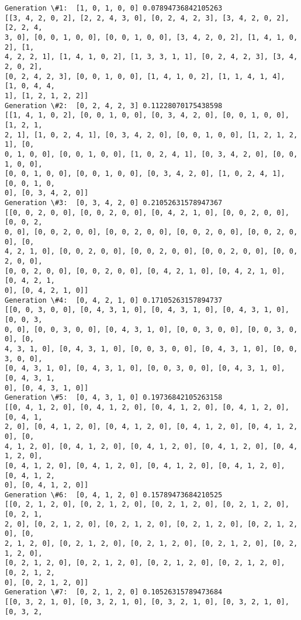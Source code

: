 \documentclass[11pt]{article}
\begin{document}
    \begin{Verbatim}[commandchars=\\\{\}]
Generation \#1:  [1, 0, 1, 0, 0] 0.07894736842105263
[[3, 4, 2, 0, 2], [2, 2, 4, 3, 0], [0, 2, 4, 2, 3], [3, 4, 2, 0, 2], [2, 2, 4,
3, 0], [0, 0, 1, 0, 0], [0, 0, 1, 0, 0], [3, 4, 2, 0, 2], [1, 4, 1, 0, 2], [1,
4, 2, 2, 1], [1, 4, 1, 0, 2], [1, 3, 3, 1, 1], [0, 2, 4, 2, 3], [3, 4, 2, 0, 2],
[0, 2, 4, 2, 3], [0, 0, 1, 0, 0], [1, 4, 1, 0, 2], [1, 1, 4, 1, 4], [1, 0, 4, 4,
1], [1, 2, 1, 2, 2]]
Generation \#2:  [0, 2, 4, 2, 3] 0.11228070175438598
[[1, 4, 1, 0, 2], [0, 0, 1, 0, 0], [0, 3, 4, 2, 0], [0, 0, 1, 0, 0], [1, 2, 1,
2, 1], [1, 0, 2, 4, 1], [0, 3, 4, 2, 0], [0, 0, 1, 0, 0], [1, 2, 1, 2, 1], [0,
0, 1, 0, 0], [0, 0, 1, 0, 0], [1, 0, 2, 4, 1], [0, 3, 4, 2, 0], [0, 0, 1, 0, 0],
[0, 0, 1, 0, 0], [0, 0, 1, 0, 0], [0, 3, 4, 2, 0], [1, 0, 2, 4, 1], [0, 0, 1, 0,
0], [0, 3, 4, 2, 0]]
Generation \#3:  [0, 3, 4, 2, 0] 0.21052631578947367
[[0, 0, 2, 0, 0], [0, 0, 2, 0, 0], [0, 4, 2, 1, 0], [0, 0, 2, 0, 0], [0, 0, 2,
0, 0], [0, 0, 2, 0, 0], [0, 0, 2, 0, 0], [0, 0, 2, 0, 0], [0, 0, 2, 0, 0], [0,
4, 2, 1, 0], [0, 0, 2, 0, 0], [0, 0, 2, 0, 0], [0, 0, 2, 0, 0], [0, 0, 2, 0, 0],
[0, 0, 2, 0, 0], [0, 0, 2, 0, 0], [0, 4, 2, 1, 0], [0, 4, 2, 1, 0], [0, 4, 2, 1,
0], [0, 4, 2, 1, 0]]
Generation \#4:  [0, 4, 2, 1, 0] 0.17105263157894737
[[0, 0, 3, 0, 0], [0, 4, 3, 1, 0], [0, 4, 3, 1, 0], [0, 4, 3, 1, 0], [0, 0, 3,
0, 0], [0, 0, 3, 0, 0], [0, 4, 3, 1, 0], [0, 0, 3, 0, 0], [0, 0, 3, 0, 0], [0,
4, 3, 1, 0], [0, 4, 3, 1, 0], [0, 0, 3, 0, 0], [0, 4, 3, 1, 0], [0, 0, 3, 0, 0],
[0, 4, 3, 1, 0], [0, 4, 3, 1, 0], [0, 0, 3, 0, 0], [0, 4, 3, 1, 0], [0, 4, 3, 1,
0], [0, 4, 3, 1, 0]]
Generation \#5:  [0, 4, 3, 1, 0] 0.19736842105263158
[[0, 4, 1, 2, 0], [0, 4, 1, 2, 0], [0, 4, 1, 2, 0], [0, 4, 1, 2, 0], [0, 4, 1,
2, 0], [0, 4, 1, 2, 0], [0, 4, 1, 2, 0], [0, 4, 1, 2, 0], [0, 4, 1, 2, 0], [0,
4, 1, 2, 0], [0, 4, 1, 2, 0], [0, 4, 1, 2, 0], [0, 4, 1, 2, 0], [0, 4, 1, 2, 0],
[0, 4, 1, 2, 0], [0, 4, 1, 2, 0], [0, 4, 1, 2, 0], [0, 4, 1, 2, 0], [0, 4, 1, 2,
0], [0, 4, 1, 2, 0]]
Generation \#6:  [0, 4, 1, 2, 0] 0.15789473684210525
[[0, 2, 1, 2, 0], [0, 2, 1, 2, 0], [0, 2, 1, 2, 0], [0, 2, 1, 2, 0], [0, 2, 1,
2, 0], [0, 2, 1, 2, 0], [0, 2, 1, 2, 0], [0, 2, 1, 2, 0], [0, 2, 1, 2, 0], [0,
2, 1, 2, 0], [0, 2, 1, 2, 0], [0, 2, 1, 2, 0], [0, 2, 1, 2, 0], [0, 2, 1, 2, 0],
[0, 2, 1, 2, 0], [0, 2, 1, 2, 0], [0, 2, 1, 2, 0], [0, 2, 1, 2, 0], [0, 2, 1, 2,
0], [0, 2, 1, 2, 0]]
Generation \#7:  [0, 2, 1, 2, 0] 0.10526315789473684
[[0, 3, 2, 1, 0], [0, 3, 2, 1, 0], [0, 3, 2, 1, 0], [0, 3, 2, 1, 0], [0, 3, 2,

\end{Verbatim}
\end{document}
